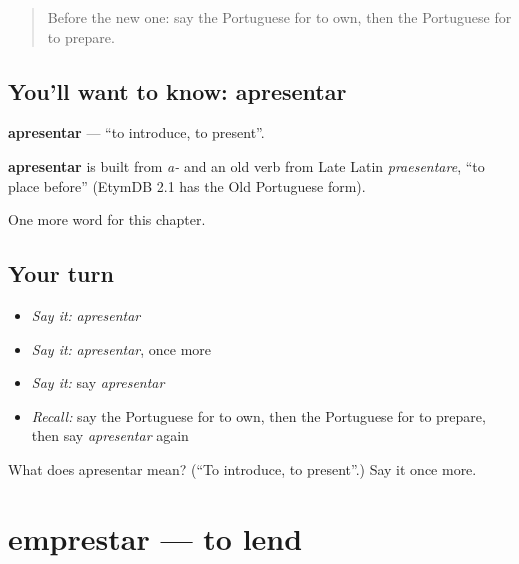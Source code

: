 \label{lesson:PT-C235-apresentar}



\begin{quote}
Before the new one: say the Portuguese for to own, then the Portuguese for to prepare.
\end{quote}

\subsection*{You'll want to know: apresentar}
\textbf{apresentar} — \textquotedblleft{}to introduce, to present\textquotedblright{}.

\begin{cousinweb}
\textbf{apresentar} is built from \emph{a-} and an old verb from Late Latin \emph{praesentare}, \textquotedblleft{}to place before\textquotedblright{} (EtymDB 2.1 has the Old Portuguese form).
\end{cousinweb}

\begin{grammarlens}[title={What you've built}]
One more word for this chapter.
\end{grammarlens}

\subsection*{Your turn}
\begin{itemize}
\raggedright
  \item \emph{Say it:} \emph{apresentar}
  \item \emph{Say it:} \emph{apresentar}, once more
  \item \emph{Say it:} say \emph{apresentar}
  \item \emph{Recall:} say the Portuguese for to own, then the Portuguese for to prepare, then say \emph{apresentar} again
\end{itemize}

\begin{tcolorbox}[breakable,colback=teal!4,colframe=teal!35!black,title={Before you move on}]
What does apresentar mean? (\textquotedblleft{}To introduce, to present\textquotedblright{}.) Say it once more.
\end{tcolorbox}
\section[emprestar]{emprestar — to lend}

\label{lesson:PT-C235-emprestar}



